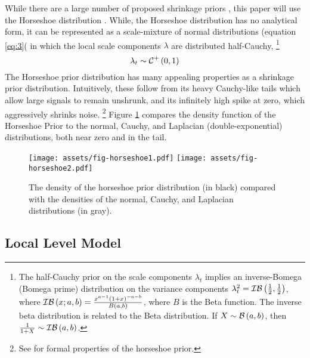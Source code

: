 \documentclass{article}
\begin{document}
While there are a large number of proposed shrinkage priors \parencites{ArmaganDunsonLee2011}{BrownGriffin2010}{PolsonScott2010}, this paper will use the Horseshoe distribution \parencites{CarvalhoPolsonScott2009}{CarvalhoPolsonScott2010}{PolsonScott2010}{PolsonScott2012}{DattaGhosh2012}.
While, the Horseshoe distribution has no analytical form, it can be represented as a scale-mixture of normal distributions (equation \eqref{eq:3}( in which the local scale components $\lambda$ are distributed half-Cauchy,%
\footnote{
The half-Cauchy prior on the scale components $\lambda_{t}$ implies an inverse-Bomega (Bomega prime) distribution on the variance components $\lambda_{t}^{2} = \mathcal{IB}\left(\frac{1}{2}, \frac{1}{2}\right)$, where $\mathcal{IB}\left(x; a, b\right) = \frac{x^{a - 1} (1 + x)^{-a - b}}{B(a, b)}$, where $B$ is the Beta function.
The inverse beta distribution is related to the Beta distribution.
If $X \sim \mathcal{B}\left(a, b\right)$, then $\frac{1}{1 + X} \sim \mathcal{IB}\left(a, b\right)$.
}
\begin{equation}
  \label{eq:6}
  \lambda_{t} \sim \mathcal{C}^{+}\left(0, 1\right)
\end{equation}
The Horseshoe prior distribution has many appealing properties as a shrinkage prior distribution.
Intuitively, these follow from its heavy Cauchy-like tails which allow large signals to remain unshrunk, and its infinitely high spike at zero, which aggressively shrinks noise.
\footnote{See \textcites{CarvalhoPolsonScott2010}{CarvalhoPolsonScott2009}{DattaGhosh2012} for formal properties of the horseshoe prior.}
Figure \ref{fig:horseshoe} compares the density function of the Horseshoe Prior to the normal, Cauchy, and Laplacian (double-exponential) distributions, both near zero and in the tail.
\begin{figure}
  \centering
  \texttt{[image: assets/fig-horseshoe1.pdf]}
  \texttt{[image: assets/fig-horseshoe2.pdf]}
  \caption{The density of the horseshoe prior distribution (in black) compared with the densities of the normal, Cauchy, and Laplacian distributions (in gray).}
  \label{fig:horseshoe}
\end{figure}

\subsection{Local Level Model}
\label{sec:local-level-model}
\end{document}
